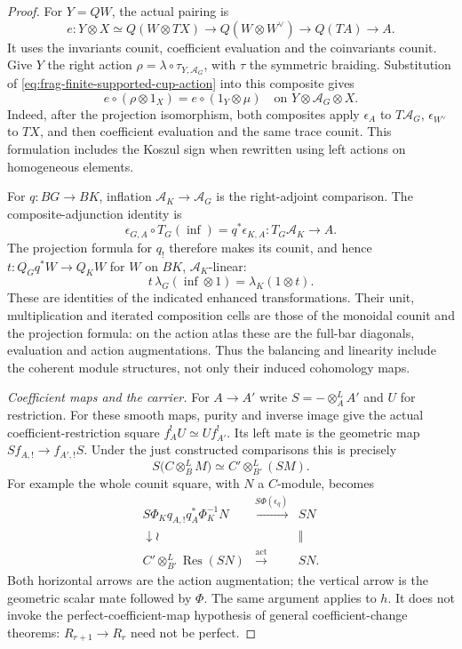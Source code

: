 \documentclass[11pt]{article}
\theoremstyle{definition}
\theoremstyle{remark}
\begin{document}
\begin{proof}
For $Y=QW$, the actual pairing is
\[
 e:Y\otimes X\simeq Q(W\otimes TX)
 \longrightarrow Q(W\otimes W^\vee)
 \longrightarrow Q(TA)\longrightarrow A.
\]
It uses the invariants counit, coefficient evaluation and the
coinvariants counit.  Give $Y$ the right action
$\rho=\lambda\circ\tau_{Y,\mathcal A_G}$, with $\tau$ the symmetric
braiding.  Substitution of \eqref{eq:frag-finite-supported-cup-action}
into this composite gives
\begin{equation}
 e\circ(\rho\otimes1_X)=e\circ(1_Y\otimes\mu)
       \quad\text{on }Y\otimes\mathcal A_G\otimes X.
 \label{eq:frag-finite-balanced-trace-pairing}
\end{equation}
Indeed, after the projection isomorphism, both composites apply
$\epsilon_A$ to $T\mathcal A_G$, $\epsilon_{W^\vee}$ to $TX$,
and then coefficient evaluation and the same trace counit.
This formulation includes the Koszul sign when rewritten using
left actions on homogeneous elements.

For $q:BG\to BK$, inflation $\mathcal A_K\to\mathcal A_G$
is the right-adjoint comparison.  The composite-adjunction identity is
\[
 \epsilon_{G,A}\circ T_G(\operatorname{inf})
       =q^*\epsilon_{K,A}:T_G\mathcal A_K\longrightarrow A.
\]
The projection formula for $q_!$ therefore makes its counit, and
hence $t:Q_Gq^*W\to Q_KW$ for $W$ on $BK$, $\mathcal A_K$-linear:
\[
 t\,\lambda_G(\operatorname{inf}\otimes1)
       =\lambda_K(1\otimes t).
\]
These are identities of the indicated enhanced transformations.
Their unit, multiplication and iterated composition cells are those
of the monoidal counit and the projection formula: on the action
atlas these are the full-bar diagonals, evaluation and action
augmentations.  Thus the balancing and linearity include the
coherent module structures, not only their induced cohomology maps.

\emph{Coefficient maps and the carrier.}
For $A\to A'$ write $S=-\otimes_A^LA'$ and $U$ for restriction.
For these smooth maps, purity and inverse image give the actual
coefficient-restriction square $f_A^!U\simeq Uf_{A'}^!$.
Its left mate is the geometric map $S f_{A,!}\to f_{A',!}S$.
Under the just constructed comparisons this is precisely
\[
 S\bigl(C\otimes_B^LM\bigr)
   \simeq C'\otimes_{B'}^L(SM).
\]
For example the whole counit square, with $N$ a $C$-module, becomes
\[
\begin{array}{ccc}
 S\Phi_K q_{A,!}q_A^*\Phi_K^{-1}N&\xrightarrow{S\Phi(\epsilon_q)}&SN\\
 \downarrow\wr&&\Vert\\
 C'\otimes_{B'}^L\operatorname{Res}(SN)&\xrightarrow{\mathrm{act}}&SN.
\end{array}
\]
Both horizontal arrows are the action augmentation; the vertical
arrow is the geometric scalar mate followed by $\Phi$.
The same argument applies to $h$.  It does not invoke the
perfect-coefficient-map hypothesis of general coefficient-change
theorems: $R_{r+1}\to R_r$ need not be perfect.


\end{proof}
\end{document}
